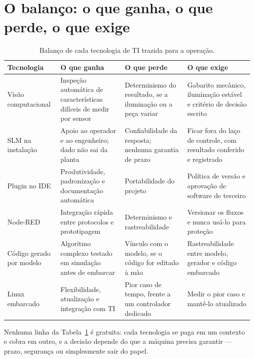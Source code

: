 \section{O balanço: o que ganha, o que perde, o que exige}

\begin{table}[H]
  \centering
  \caption{Balanço de cada tecnologia de TI trazida para a operação.}
  \label{tab:balanco-ti-to}
  \begin{tabular}{p{2.9cm} p{3.9cm} p{3.4cm} p{4.1cm}}
    \toprule
    Tecnologia & O que ganha & O que perde & O que exige \\
    \midrule
    Visão computacional
      & Inspeção automática de características difíceis de medir por sensor
      & Determinismo do resultado, se a iluminação ou a peça variar
      & Gabarito mecânico, iluminação estável e critério de decisão escrito \\
    \addlinespace
    SLM na instalação
      & Apoio ao operador e ao engenheiro; dado não sai da planta
      & Confiabilidade da resposta; nenhuma garantia de prazo
      & Ficar fora do laço de controle, com resultado conferido e registrado \\
    \addlinespace
    Plugin no IDE
      & Produtividade, padronização e documentação automática
      & Portabilidade do projeto
      & Política de versão e aprovação de software de terceiro \\
    \addlinespace
    Node-RED
      & Integração rápida entre protocolos e prototipagem
      & Determinismo e rastreabilidade
      & Versionar os fluxos e nunca usá-lo para proteção \\
    \addlinespace
    Código gerado por modelo
      & Algoritmo complexo testado em simulação antes de embarcar
      & Vínculo com o modelo, se o código for editado à mão
      & Rastreabilidade entre modelo, gerador e código embarcado \\
    \addlinespace
    Linux embarcado
      & Flexibilidade, atualização e integração com TI
      & Pior caso de tempo, frente a um controlador dedicado
      & Medir o pior caso e mantê-lo atualizado \\
    \bottomrule
  \end{tabular}
\end{table}

Nenhuma linha da Tabela~\ref{tab:balanco-ti-to} é gratuita: cada tecnologia se paga em um contexto e
cobra em outro, e a decisão depende do que a máquina precisa garantir --- prazo, segurança ou
simplesmente sair do papel.

